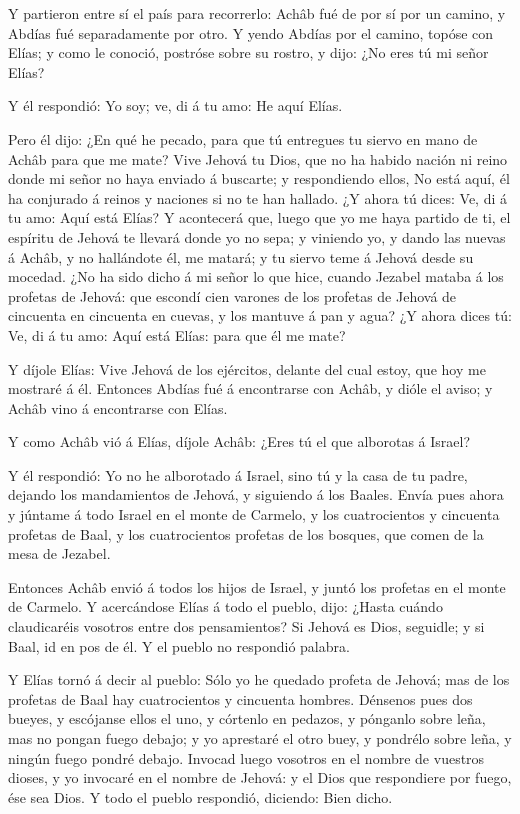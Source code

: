  Y partieron entre sí el país para recorrerlo: Achâb fué de
por sí por un camino, y Abdías fué separadamente por otro. 
Y yendo Abdías por el camino, topóse con Elías; y como le conoció,
postróse sobre su rostro, y dijo: ¿No eres tú mi señor Elías?

 Y él respondió: Yo soy; ve, di á tu amo: He aquí Elías.

 Pero él dijo: ¿En qué he pecado, para que tú entregues tu
siervo en mano de Achâb para que me mate?  Vive Jehová tu
Dios, que no ha habido nación ni reino donde mi señor no haya enviado á
buscarte; y respondiendo ellos, No está aquí, él ha conjurado á reinos y
naciones si no te han hallado.  ¿Y ahora tú dices: Ve, di á
tu amo: Aquí está Elías?  Y acontecerá que, luego que yo me
haya partido de ti, el espíritu de Jehová te llevará donde yo no sepa; y
viniendo yo, y dando las nuevas á Achâb, y no hallándote él, me matará;
y tu siervo teme á Jehová desde su mocedad.  ¿No ha sido
dicho á mi señor lo que hice, cuando Jezabel mataba á los profetas de
Jehová: que escondí cien varones de los profetas de Jehová de cincuenta
en cincuenta en cuevas, y los mantuve á pan y agua?  ¿Y
ahora dices tú: Ve, di á tu amo: Aquí está Elías: para que él me mate?

 Y díjole Elías: Vive Jehová de los ejércitos, delante del
cual estoy, que hoy me mostraré á él.  Entonces Abdías fué
á encontrarse con Achâb, y dióle el aviso; y Achâb vino á encontrarse
con Elías.

 Y como Achâb vió á Elías, díjole Achâb: ¿Eres tú el que
alborotas á Israel?

 Y él respondió: Yo no he alborotado á Israel, sino tú y la
casa de tu padre, dejando los mandamientos de Jehová, y siguiendo á los
Baales.  Envía pues ahora y júntame á todo Israel en el
monte de Carmelo, y los cuatrocientos y cincuenta profetas de Baal, y
los cuatrocientos profetas de los bosques, que comen de la mesa de
Jezabel.

 Entonces Achâb envió á todos los hijos de Israel, y juntó
los profetas en el monte de Carmelo.  Y acercándose Elías á
todo el pueblo, dijo: ¿Hasta cuándo claudicaréis vosotros entre dos
pensamientos? Si Jehová es Dios, seguidle; y si Baal, id en pos de él. Y
el pueblo no respondió palabra.

 Y Elías tornó á decir al pueblo: Sólo yo he quedado
profeta de Jehová; mas de los profetas de Baal hay cuatrocientos y
cincuenta hombres.  Dénsenos pues dos bueyes, y escójanse
ellos el uno, y córtenlo en pedazos, y pónganlo sobre leña, mas no
pongan fuego debajo; y yo aprestaré el otro buey, y pondrélo sobre leña,
y ningún fuego pondré debajo.  Invocad luego vosotros en el
nombre de vuestros dioses, y yo invocaré en el nombre de Jehová: y el
Dios que respondiere por fuego, ése sea Dios. Y todo el pueblo
respondió, diciendo: Bien dicho.

